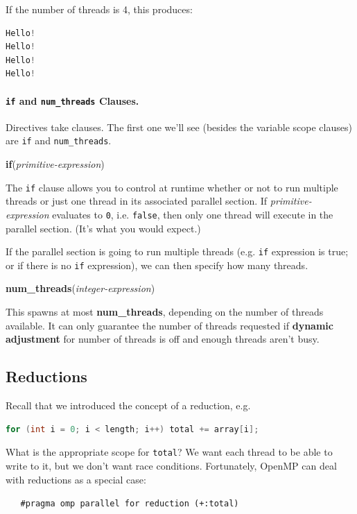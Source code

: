 \documentclass[a4paper]{report}
\begin{document}
  If the number of threads is 4, this produces:
  \begin{lstlisting}[language=C]
Hello!
Hello!
Hello!
Hello!
  \end{lstlisting}

\paragraph{{\tt if} and {\tt num\_threads} Clauses.} Directives take clauses.
The first one we'll see (besides the variable scope clauses) are {\tt if} and
{\tt num\_threads}.

  \begin{center}
    {\bf if}({\it primitive-expression})    
  \end{center}
The {\tt if} clause allows you to control at runtime whether or not to run
multiple threads or just one thread in its associated parallel section.
If {\it primitive-expression} evaluates to {\tt 0}, i.e. {\tt false}, then
only one thread will execute in the parallel section. (It's what you would expect.)


If the parallel section is going to run multiple threads (e.g. {\tt if} expression
is true; or if there is no {\tt if} expression), we can then specify how many threads.
  \begin{center}
    {\bf num\_threads}({\it integer-expression})    
  \end{center}

This spawns at most {\bf num\_threads}, depending on the number of
threads available.  It can only guarantee the number of threads
requested if {\bf dynamic adjustment} for number of threads is off and
enough threads aren't busy.

\subsection*{Reductions}
Recall that we introduced the concept of a reduction, e.g.
{\small
\begin{lstlisting}[language=C,morekeywords={foreach,pragma,omp,parallel,single,nowait,task,untied,barrier,taskyield}]
  for (int i = 0; i < length; i++) total += array[i];
\end{lstlisting}
}
What is the appropriate scope for {\tt total}? We want each thread
to be able to write to it, but we don't want race conditions.
Fortunately, OpenMP can deal with reductions as a special case:

\verb!   #pragma omp parallel for reduction (+:total)!
\end{document}

